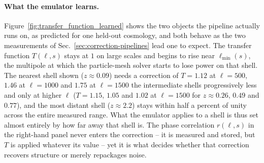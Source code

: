 \documentclass{report}
\begin{document}
\paragraph{What the emulator learns.} Figure~\ref{fig:transfer_function_learned}
shows the two objects the pipeline actually runs on, as predicted for one
held-out cosmology, and both behave as the two measurements of
Sec.~\ref{sec:correction-pipelines} lead one to expect. The transfer function \mbox{$T(\ell, s)$} stays at \mbox{$1$} on large scales and begins to rise near
\mbox{$\ell_{\min}(s)$}, the multipole at which the particle-mesh solver starts to lose power
on that shell. The nearest shell shown
(\mbox{$z \approx 0.09$}) needs a correction of \mbox{$T = 1.12$} at \mbox{$\ell = 500$},
\mbox{$1.46$} at \mbox{$\ell = 1000$} and \mbox{$1.75$} at \mbox{$\ell = 1500$} the intermediate shells progressively less and only at higher \mbox{$\ell$} (\mbox{$T = 1.15$}, \mbox{$1.05$} and \mbox{$1.02$} at \mbox{$\ell = 1500$} for \mbox{$z \approx 0.26$},
\mbox{$0.49$} and \mbox{$0.77$}), and the most distant shell (\mbox{$z \approx 2.2$}) stays
within half a percent of unity across the entire measured range. What the emulator applies to a shell is thus set almost
entirely by how far away that shell is. The phase correlation \mbox{$r(\ell, s)$} in the right-hand panel never enters the correction -- it is measured and stored, but $T$ is applied whatever its value -- yet it is what decides whether that correction recovers structure or merely repackages noise.
\end{document}
